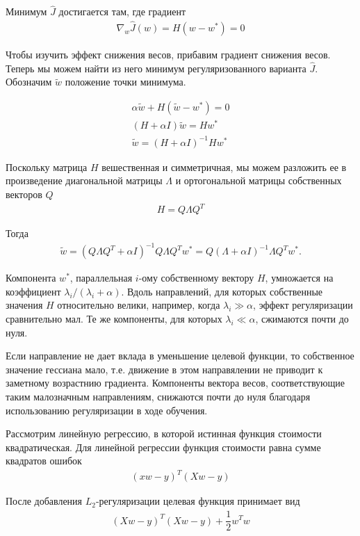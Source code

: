 \documentclass[%
	11pt,
	a4paper,
	utf8,
]{article}
\begin{document}
Минимум $ \hat{J} $ достигается там, где градиент
\begin{align*}
	\nabla_w \hat{J}(w) = H(w - w^*) = 0
\end{align*}

Чтобы изучить эффект снижения весов, прибавим градиент снижения весов. Теперь мы можем найти из него минимум регуляризованного варианта $ \hat{J} $. Обозначим $ \tilde{w} $ положение точки минимума.

\begin{align*}
	\alpha \tilde{w} + H (\tilde{w} - w^*) = 0 \\
	(H + \alpha I) \tilde{w} = H w^* \\
	\tilde{w} = (H + \alpha I)^{-1} H w^*
\end{align*}

Поскольку матрица $ H $ вешественная и симметричная, мы можем разложить ее в произведение диагональной матрицы $ \Lambda $ и ортогональной матрицы собственных векторов $ Q $
\begin{align*}
	H = Q \Lambda Q^T
\end{align*}

Тогда
\begin{align*}
	\tilde{w} = (Q \Lambda Q^T + \alpha I)^{-1} Q \Lambda Q^T w^* = Q(\Lambda + \alpha I)^{-1} \Lambda Q^T w^*.
\end{align*}

Компонента $ w^* $, параллельная $ i $-ому собственному вектору $ H $, умножается на коэффициент $ \lambda_i / (\lambda_i + \alpha) $. Вдоль направлений, для которых собственные значения $ H $ относительно велики, например, когда $ \lambda_i \gg \alpha $, эффект регуляризации сравнительно мал. Те же компоненты, для которых $ \lambda_i \ll \alpha $, сжимаются почти до нуля.

Если направление не дает вклада в уменьшение целевой функции, то собственное значение гессиана мало, т.е. движение в этом направялении не приводит к заметному возрастнию градиента. Компоненты вектора весов, соответствующие таким малозначным направлениям, снижаются почти до нуля благодаря использованию регуляризации в ходе обучения.

Рассмотрим линейную регрессию, в которой истинная функция стоимости квадратическая. Для линейной регрессии функция стоимости равна сумме квадратов ошибок
\begin{align*}
	(x w - y)^T (X w - y)
\end{align*}

После добавления $ L_2 $-регуляризации целевая функция принимает вид
\begin{align*}
	(X w - y)^T (X w -y) + \dfrac{1}{2} w^T w
\end{align*}
\end{document}
